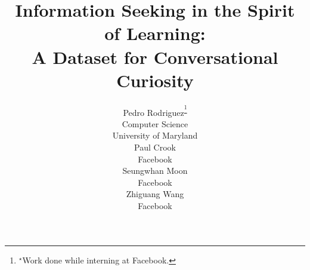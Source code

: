 \documentclass[11pt,a4paper]{article}
\title{Information Seeking in the Spirit of Learning:\\A Dataset for Conversational Curiosity}
\author{
    Pedro Rodriguez\textsuperscript{\thanks{$^\star$Work done while interning at Facebook.}} \\
    Computer Science\\
    University of Maryland\\
    \emaillink{pedro@cs.umd.edu}
    \And
    Paul Crook\\
    Facebook \\
    \emaillink{pacrook@fb.com}
    \AND
    Seungwhan Moon \\
    Facebook \\
    \emaillink{shanemoon@fb.com}
    \And
    Zhiguang Wang \\
    Facebook \\
    \emaillink{zgwang@fb.com}
}
\date{}
\begin{document}
\maketitle
\setlength{\abovedisplayskip}{3pt}
\setlength{\belowdisplayskip}{3pt}

\begin{abstract}
  
\end{abstract}













\clearpage
\begin{appendix}
  
\end{appendix}
\end{document}
